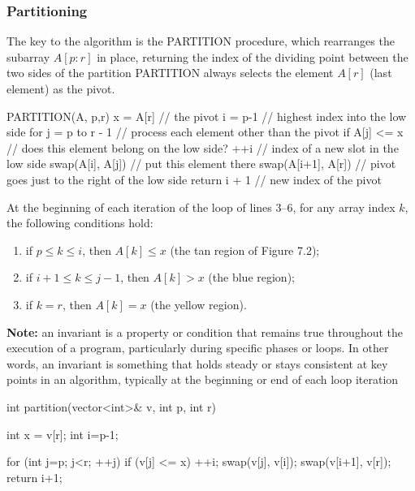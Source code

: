 \documentclass{report}
\begin{document}
\subsubsection{Partitioning}
\bigbreak \noindent 
The key to the algorithm is the PARTITION procedure, which rearranges the subarray $A[p:r]$ in place, returning the index of the dividing point between the two sides of the partition
\bigbreak \noindent 
PARTITION always selects the element $A[r]$ (last element) as the pivot.
\bigbreak \noindent 
\begin{cppcode}
PARTITION(A, p,r)
    x = A[r]                // the pivot
    i = p-1                 // highest index into the low side
    for j = p to r - 1      // process each element other than the pivot
        if A[j] <= x        // does this element belong on the low side?
            ++i                 // index of a new slot in the low side 
            swap(A[i], A[j])    // put this element there 
    swap(A[i+1], A[r])      // pivot goes just to the right of the low side 
    return i + 1            // new index of the pivot 
\end{cppcode}
\bigbreak \noindent 
At the beginning of each iteration of the loop of lines 3–6, for any array index \( k \), the following conditions hold:
\begin{enumerate}
    \item if \( p \leq k \leq i \), then \( A[k] \leq x \) (the tan region of Figure 7.2);
    \item if \( i + 1 \leq k \leq j - 1 \), then \( A[k] > x \) (the blue region);
    \item if \( k = r \), then \( A[k] = x \) (the yellow region).
\end{enumerate}
\bigbreak \noindent 
\textbf{Note: } an invariant is a property or condition that remains true throughout the execution of a program, particularly during specific phases or loops. In other words, an invariant is something that holds steady or stays consistent at key points in an algorithm, typically at the beginning or end of each loop iteration
\bigbreak \noindent 
{}

\bigbreak \noindent 
\begin{cppcode}
int partition(vector<int>& v, int p, int r) {
    int x = v[r];
    int i=p-1;

    for (int j=p; j<r; ++j) {
        if (v[j] <= x) {
            ++i;
            swap(v[j], v[i]);
        }
    }
    swap(v[i+1], v[r]);
    return i+1;
}
\end{cppcode}
\end{document}

